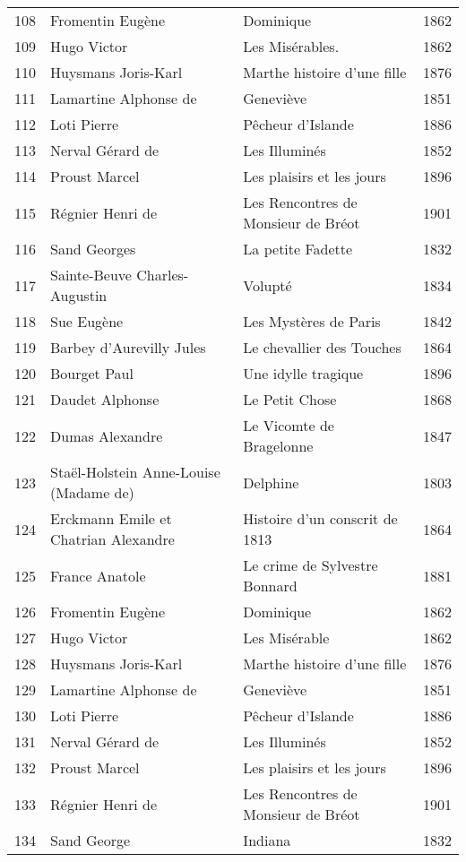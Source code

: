 \begin{center}
\begin{small}
\begin{longtable}{l l l l}
  108 & Fromentin Eugène & Dominique & 1862 \\
  109 & Hugo Victor & Les Misérables. & 1862 \\
  110 & Huysmans Joris-Karl & Marthe histoire d’une fille & 1876 \\
  111 & Lamartine Alphonse de & Geneviève & 1851 \\
  112 & Loti Pierre & Pêcheur d’Islande & 1886 \\
  113 & Nerval Gérard de & Les Illuminés & 1852 \\
  114 & Proust Marcel & Les plaisirs et les jours & 1896 \\
  115 & Régnier Henri de & Les Rencontres de Monsieur de Bréot & 1901 \\
  116 & Sand Georges & La petite Fadette & 1832 \\
  117 & Sainte-Beuve Charles-Augustin & Volupté & 1834 \\
  118 & Sue Eugène & Les Mystères de Paris & 1842 \\
  119 & Barbey d'Aurevilly Jules & Le chevallier des Touches & 1864 \\
  120 & Bourget Paul & Une idylle tragique & 1896 \\
  121 & Daudet Alphonse & Le Petit Chose & 1868 \\
  122 & Dumas Alexandre & Le Vicomte de Bragelonne & 1847 \\
  123 & Staël-Holstein Anne-Louise (Madame de) & Delphine & 1803 \\
  124 & Erckmann Emile et Chatrian Alexandre & Histoire d’un conscrit de 1813 & 1864 \\
  125 & France Anatole & Le crime de Sylvestre Bonnard & 1881 \\
  126 & Fromentin Eugène & Dominique & 1862 \\
  127 & Hugo Victor & Les Misérable & 1862 \\
  128 & Huysmans Joris-Karl & Marthe histoire d’une fille & 1876 \\
  129 & Lamartine Alphonse de & Geneviève & 1851 \\
  130 & Loti Pierre & Pêcheur d’Islande & 1886 \\
  131 & Nerval Gérard de & Les Illuminés & 1852 \\
  132 & Proust Marcel & Les plaisirs et les jours & 1896 \\
  133 & Régnier Henri de & Les Rencontres de Monsieur de Bréot & 1901 \\
  134 & Sand George & Indiana & 1832 \\

\end{longtable}
\end{small}
\end{center}

